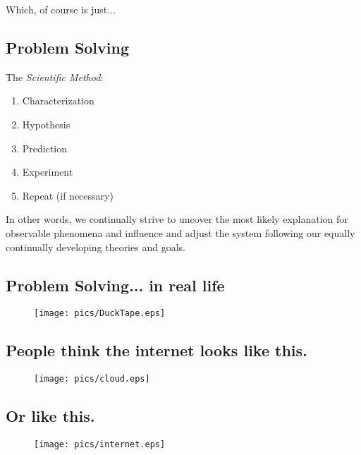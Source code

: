 \documentclass[xga]{xdvislides}
\begin{document}
Which, of course is just...

\subsection{Problem Solving}
The {\em Scientific Method}:

\begin{enumerate}
	\item Characterization
	\item Hypothesis
	\item Prediction
	\item Experiment
	\item Repeat (if necessary)
\end{enumerate}

In other words, we continually strive to uncover the most likely explanation
for observable phenomena and influence and adjust the system following our
equally continually developing theories and goals.

\subsection{Problem Solving... in real life}
\begin{figure}[hb]
	\begin{center}
		\texttt{[image: pics/DuckTape.eps]} \\
	\end{center}
\end{figure}

\subsection{People think the internet looks like this.}
\begin{figure}[hb]
	\begin{center}
		\texttt{[image: pics/cloud.eps]} \\
	\end{center}
\end{figure}

\subsection{Or like this.}
\begin{figure}[hb]
	\begin{center}
		\texttt{[image: pics/internet.eps]} \\
	\end{center}
\end{figure}
\end{document}
